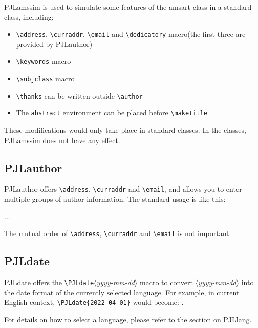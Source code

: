 \documentclass[allowbf]{lebhart}
\providecommand{\meta}[1]{$\langle${\normalfont\itshape#1}$\rangle$}
\providecommand{\PJLamssim}{\textsf{PJLamssim}}
\providecommand{\PJLauthor}{\textsf{PJLauthor}}
\providecommand{\PJLdatestr}{\textsf{PJLdate}}
\providecommand{\PJLlang}{\textsf{PJLlang}}
\begin{document}
\PJLamssim{} is used to simulate some features of the \textsf{amsart} class in a standard class, including:
\begin{itemize}
    \item \lstinline|\address|, \lstinline|\curraddr|, \lstinline|\email| and \lstinline|\dedicatory| macro(the first three are provided by \PJLauthor{})
    \item \lstinline|\keywords| macro
    \item \lstinline|\subjclass| macro
    \item \lstinline|\thanks| can be written outside \lstinline|\author|
    \item The \lstinline|abstract| environment can be placed before \lstinline|\maketitle|
\end{itemize}

These modifications would only take place in standard classes. In the \AmS{} classes, \PJLamssim{} does not have any effect.

\subsection{PJLauthor}

\PJLauthor{} offers \lstinline|\address|, \lstinline|\curraddr| and \lstinline|\email|, and allows you to enter multiple groups of author information. The standard usage is like this:
\begin{code}
  \author{(*\meta{author 1}*)}
  \address{(*\meta{address 1}*)}
  \email{(*\meta{email 1}*)}
  \author{(*\meta{author 2}*)}
  \address{(*\meta{address 2}*)}
  \email{(*\meta{email 2}*)}
  ...
\end{code}
The mutual order of \lstinline|\address|, \lstinline|\curraddr| and \lstinline|\email| is not important.

\subsection{PJLdate}

\PJLdatestr{} offers the \lstinline|\PJLdate|\meta{yyyy-mm-dd} macro to convert \meta{yyyy-mm-dd} into the date format of the currently selected language. For example, in current English context, \lstinline|\PJLdate{2022-04-01}| would become: .

For details on how to select a language, please refer to the section on \PJLlang{}.
\end{document}
